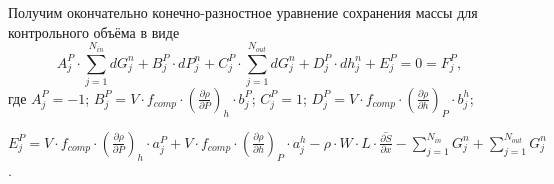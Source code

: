 Получим окончательно конечно-разностное уравнение сохранения массы для \\ кон\-троль\-но\-го объёма в виде
\begin{equation}
\label{formula44}
\boxed{A_j^P \cdot \sum_{j=1}^{N_{in}} dG_j^n + B_j^P \cdot dP_j^n + C_j^P \cdot \sum_{j=1}^{N_{out}} dG_j^n + D_j^P \cdot dh_j^n + E_j^P = 0 = F_j^P},
\end{equation}
где $A_j^P=-1$; $B_j^P=V \cdot f_{comp}\cdot \left( \frac{\partial\rho}{\partial P}\right)_{h} \cdot b_j^P$; $C_j^P=1$; $D_j^P=V \cdot f_{comp}\cdot \left(\frac{\partial\rho}{\partial h}\right)_{P} \cdot b_j^h$;

\noindent $E_j^P=V \cdot f_{comp}\cdot \left( \frac{\partial\rho}{\partial P}\right)_{h} \cdot a_j^P + V \cdot f_{comp}\cdot \left(\frac{\partial\rho}{\partial h}\right)_{P}\cdot a_j^h - \rho\cdot W \cdot L \cdot \overline{\frac{\partial S}{\partial x}} - \sum_{j=1}^{N_{in}} G_j^n + \sum_{j=1}^{N_{out}} G_j^n $.










